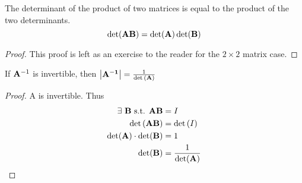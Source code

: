 \begin{theorem}\label{thm:det-distr}
  The determinant of the product of two matrices is equal to the product of the two determinants.
  $$\det(\mathbf{AB}) = \det(\mathbf{A}) \det(\mathbf{B})$$
\end{theorem}
\begin{proof}
  This proof is left as an exercise to the reader for the $2 \times 2$ matrix case.
\end{proof}

\begin{theorem}
  If $\mathbf{A} ^{-1}$ is invertible, then $\left|\mathbf{A ^{-1}}\right| = \frac{1}{\det{(\mathbf{A})}}$ 
\end{theorem}

\begin{proof}
  \matri A is invertible. Thus 
  \begin{align*}
    \exists\ \mathbf{B} \text{ s.t. } \mathbf{AB} &= I\\
    \det{(\mathbf{AB})} &= \det{(I)}\\
    \det(\mathbf{A}) \cdot \det(\mathbf{B}) &= 1\\
    \det(\mathbf{B}) &= \frac{1}{\det(\mathbf{A})}
 \end{align*}
\end{proof}
